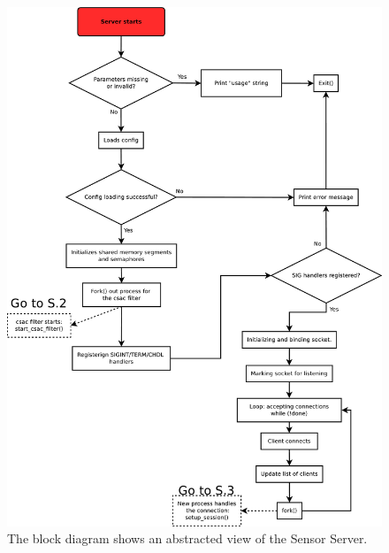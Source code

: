 \documentclass[12pt,english,a4paper]{report}
\begin{document}
\begin{figure}\label{server_core}
\centering
  \includegraphics[scale=0.3]{server_core.pdf}
   \caption[Socket Server execution flow block diagram]{The block diagram shows an abstracted view of the Sensor Server.}
\end{figure}
\end{document}
